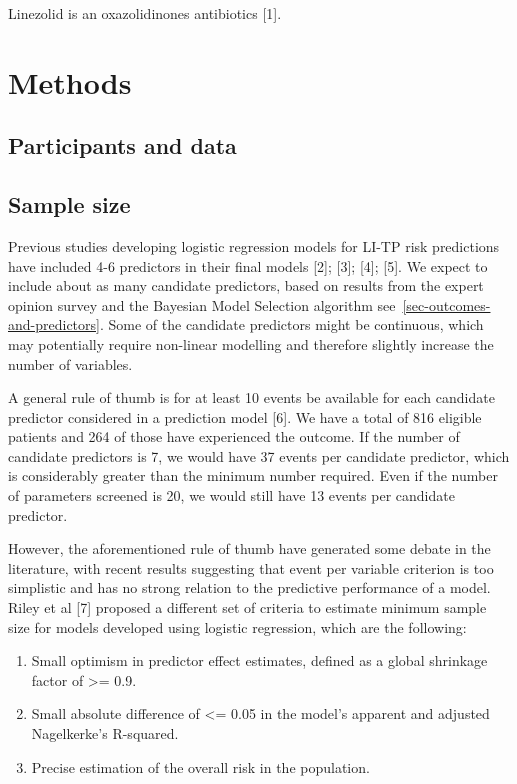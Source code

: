\documentclass[
  letterpaper,
  DIV=11,
  numbers=noendperiod]{scrartcl}
\providecommand{\tightlist}{%
  \setlength{\itemsep}{0pt}\setlength{\parskip}{0pt}}\usepackage{longtable,booktabs,array}
\begin{document}
Linezolid is an oxazolidinones antibiotics {[}1{]}.

\section{Methods}\label{methods}

\subsection{Participants and data}\label{participants-and-data}

\subsection{Sample size}\label{sample-size}

Previous studies developing logistic regression models for LI-TP risk
predictions have included 4-6 predictors in their final models {[}2{]};
{[}3{]}; {[}4{]}; {[}5{]}. We expect to include about as many candidate
predictors, based on results from the expert opinion survey and the
Bayesian Model Selection algorithm
see~\ref{sec-outcomes-and-predictors}. Some of the candidate predictors
might be continuous, which may potentially require non-linear modelling
and therefore slightly increase the number of variables.

A general rule of thumb is for at least 10 events be available for each
candidate predictor considered in a prediction model {[}6{]}. We have a
total of 816 eligible patients and 264 of those have experienced the
outcome. If the number of candidate predictors is 7, we would have 37
events per candidate predictor, which is considerably greater than the
minimum number required. Even if the number of parameters screened is
20, we would still have 13 events per candidate predictor.

However, the aforementioned rule of thumb have generated some debate in
the literature, with recent results suggesting that event per variable
criterion is too simplistic and has no strong relation to the predictive
performance of a model. Riley et al {[}7{]} proposed a different set of
criteria to estimate minimum sample size for models developed using
logistic regression, which are the following:

\begin{enumerate}
\def\labelenumi{\arabic{enumi}.}
\tightlist
\item
  Small optimism in predictor effect estimates, defined as a global
  shrinkage factor of \textgreater= 0.9.
\item
  Small absolute difference of \textless= 0.05 in the model's apparent
  and adjusted Nagelkerke's R-squared.
\item
  Precise estimation of the overall risk in the population.
\end{enumerate}
\end{document}

